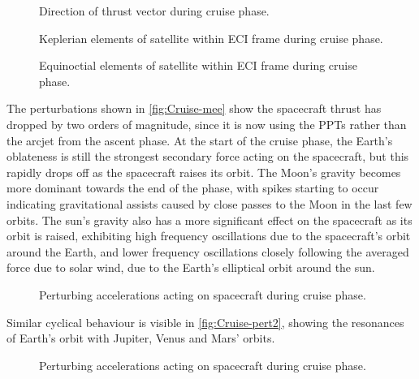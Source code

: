 \begin{figure}
\centering
\def\svgwidth{\figurewidth}

\caption{Direction of thrust vector during cruise phase.}
\label{fig:Cruise-thrust}
\end{figure}

\begin{figure}
\centering
\def\svgwidth{\figurewidth}

\caption{Keplerian elements of satellite within ECI frame during cruise phase.}
\label{fig:Cruise-kep}
\end{figure}

\begin{figure}
\centering
\def\svgwidth{\figurewidth}

\caption{Equinoctial elements of satellite within ECI frame during cruise phase.}
\label{fig:Cruise-mee}
\end{figure}

The perturbations shown in \autoref{fig:Cruise-mee} show the spacecraft thrust has dropped by two orders of magnitude, since it is now using the PPTs rather than the arcjet from the ascent phase. At the start of the cruise phase, the Earth's oblateness is still the strongest secondary force acting on the spacecraft, but this rapidly drops off as the spacecraft raises its orbit. The Moon's gravity becomes more dominant towards the end of the phase, with spikes starting to occur indicating gravitational assists caused by close passes to the Moon in the last few orbits. The sun's gravity also has a more significant effect on the spacecraft as its orbit is raised, exhibiting high frequency oscillations due to the spacecraft's orbit around the Earth, and lower frequency oscillations closely following the averaged force due to solar wind, due to the Earth's elliptical orbit around the sun.

\begin{figure}
\centering
\def\svgwidth{\figurewidth}

\caption{Perturbing accelerations acting on spacecraft during cruise phase.}
\label{fig:Cruise-pert}
\end{figure}

Similar cyclical behaviour is visible in \autoref{fig:Cruise-pert2}, showing the resonances of Earth's orbit with Jupiter, Venus and Mars' orbits.

\begin{figure}
\centering
\def\svgwidth{\figurewidth}

\caption{Perturbing accelerations acting on spacecraft during cruise phase.}
\label{fig:Cruise-pert2}
\end{figure}

